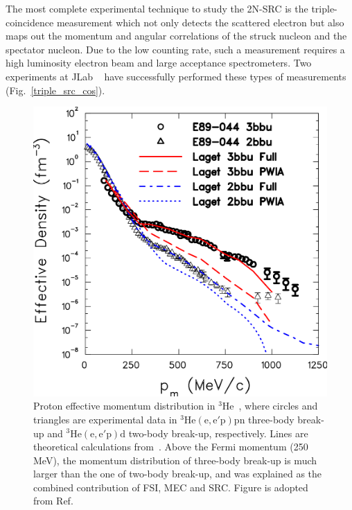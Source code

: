   The most complete experimental technique to study the 2N-SRC is the triple-coincidence measurement which not only detects the scattered electron but also maps out the momentum and angular correlations of the struck nucleon and the spectator nucleon. Due to the low counting rate, such a measurement requires a high luminosity electron beam and large acceptance spectrometers. Two experiments at JLab ~\cite{PhysRevLett.99.072501,Subedi:2008zz,E07006_pr} have successfully performed these types of measurements (Fig.~\ref{triple_src_cos}).

\begin{figure}[!ht]
  \begin{center}
    \includegraphics[type=pdf,ext=.pdf,read=.pdf,width=0.60\linewidth]{./figures/physics/10yrSRC_fig3}
    \caption[Proton effective momentum distribution in $\mathrm{^{3}He}$.]{\footnotesize{Proton effective momentum distribution in $\mathrm{^{3}He}$~\cite{PhysRevLett.94.082305}, where circles and triangles are experimental data in $\mathrm{^{3}He(e,e'p)pn}$ three-body break-up and $\mathrm{^{3}He(e,e'p)d}$ two-body break-up, respectively. Lines are theoretical calculations from~\cite{Laget200549}. Above the Fermi momentum (250 MeV), the momentum distribution of three-body break-up is much larger than the one of two-body break-up, and was explained as the combined contribution of FSI, MEC and SRC. Figure is adopted from Ref.~\cite{PhysRevLett.94.082305}}}
    \label{10yrSRC_fig3}
  \end{center}
\end{figure} 
